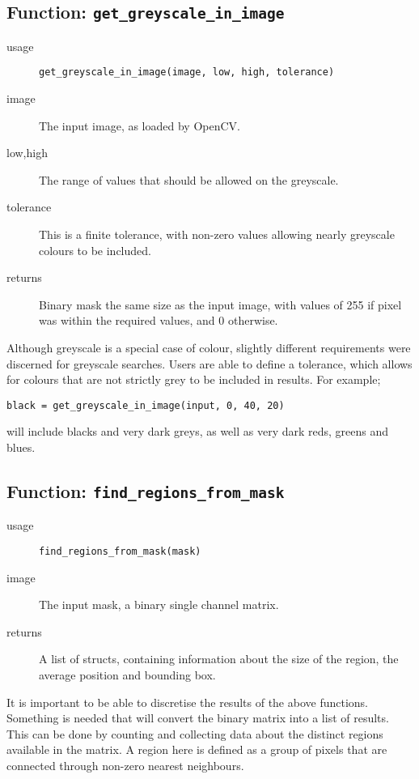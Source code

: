 \documentclass[../main.tex]{subfiles}
\begin{document}
  \subsection{Function: \texttt{get\_greyscale\_in\_image}} 
    \begin{description}
      \item[usage] \texttt{get\_greyscale\_in\_image(image, low, high, tolerance)}
      \item[image] The input image, as loaded by OpenCV.
      \item[low,high] The range of values that should be allowed on the greyscale.
      \item[tolerance] This is a finite tolerance, with non-zero values allowing nearly greyscale colours to be included.
      \item[returns] Binary mask the same size as the input image, with values of 255 if pixel was within the required values, and 0 otherwise.
    \end{description}
    Although greyscale is a special case of colour, slightly different requirements were discerned for greyscale searches.
    Users are able to define a tolerance, which allows for colours that are not strictly grey to be included in results.
    For example; 
    \begin{center}
      \texttt{black = get\_greyscale\_in\_image(input, 0, 40, 20)}
    \end{center}
    will include blacks and very dark greys, as well as very dark reds, greens and blues.
  \subsection{Function: \texttt{find\_regions\_from\_mask}} 
    \begin{description}
      \item[usage] \texttt{find\_regions\_from\_mask(mask)}
      \item[image] The input mask, a binary single channel matrix.
      \item[returns] A list of structs, containing information about the size of the region, the average position and bounding box.
    \end{description}
    It is important to be able to discretise the results of the above functions.
    Something is needed that will convert the binary matrix into a list of results.
    This can be done by counting and collecting data about the distinct regions available in the matrix.
    A region here is defined as a group of pixels that are connected through non-zero nearest neighbours.
  
\end{document}
